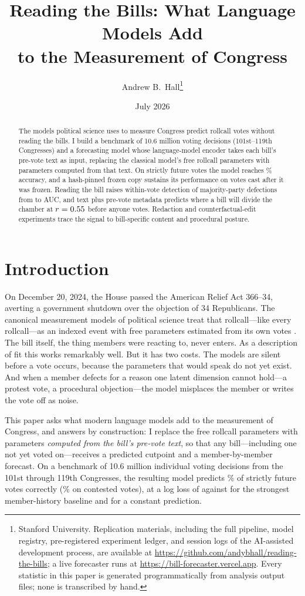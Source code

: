 \documentclass[12pt]{article}
\title{Reading the Bills: What Language Models Add\\ to the Measurement of Congress}
\author{Andrew B.\ Hall\thanks{Stanford University. Replication materials,
including the full pipeline, model registry, pre-registered experiment
ledger, and session logs of the AI-assisted development process, are
available at \url{https://github.com/andybhall/reading-the-bills}; a live
forecaster runs at \url{https://bill-forecaster.vercel.app}. Every
statistic in this paper is generated programmatically from analysis
output files; none is transcribed by hand.}}
\date{July 2026}
\begin{document}
\maketitle
\onehalfspacing

\begin{abstract}
\noindent The models political science uses to measure Congress predict
rollcall votes without reading the bills. I build a benchmark of 10.6
million voting decisions (101st--119th Congresses) and a forecasting
model whose language-model encoder takes each bill's pre-vote text as
input, replacing the classical model's free rollcall parameters with
parameters computed from that text. On strictly future votes the model
reaches \champForecastAcc\% accuracy, and a hash-pinned frozen copy
sustains its performance on votes cast after it was frozen. Reading the
bill raises within-vote detection of majority-party defections from
\protAUCnotext{} to \protAUCtext{} AUC, and text plus pre-vote metadata
predicts where a bill will divide the chamber at $r = 0.55$ before
anyone votes. Redaction and counterfactual-edit experiments trace the
signal to bill-specific content and procedural posture.
\end{abstract}

\section{Introduction}

On December 20, 2024, the House passed the American Relief Act 366--34,
averting a government shutdown over the objection of 34 Republicans. The
canonical measurement models of political science treat that
rollcall---like every rollcall---as an indexed event with free
parameters estimated from its own votes
\citep{poole1997congress, clinton2004statistical}. The bill itself, the
thing members were reacting to, never enters. As a description of fit
this works remarkably well. But it has two costs. The models are silent
before a vote occurs, because the parameters that would speak do not yet
exist. And when a member defects for a reason one latent dimension
cannot hold---a protest vote, a procedural objection---the model
misplaces the member or writes the vote off as noise.

This paper asks what modern language models add to the measurement of
Congress, and answers by construction: I replace the free rollcall
parameters with parameters \emph{computed from the bill's pre-vote
text}, so that any bill---including one not yet voted on---receives a
predicted cutpoint and a member-by-member forecast. On a benchmark of
10.6 million individual voting decisions from the 101st through 119th
Congresses, the resulting model predicts \champForecastAcc\% of strictly
future votes correctly (\champContestedAcc\% on contested votes), at a
log loss of \champForecastLL{} against \memberqForecastLL{} for the
strongest member-history baseline and \constantForecastLL{} for a
constant prediction.
\end{document}
